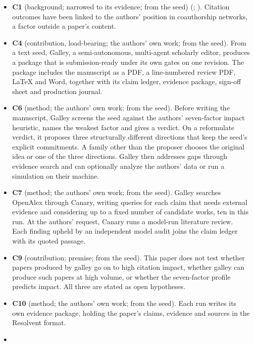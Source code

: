 \documentclass[
]{article}
\providecommand{\tightlist}{%
  \setlength{\itemsep}{0pt}\setlength{\parskip}{0pt}}
\begin{document}
\begin{itemize}
\tightlist
\item
  \textbf{C1} (background; narrowed to its evidence; from the seed)
  (;
  ). Citation outcomes
  have been linked to the authors' position in coauthorship networks, a
  factor outside a paper's content.
\item
  \textbf{C4} (contribution, load-bearing; the authors' own work; from
  the seed). From a text seed, Galley, a semi-autonomous, multi-agent
  scholarly editor, produces a package that is submission-ready under
  its own gates on one revision. The package includes the manuscript as
  a PDF, a line-numbered review PDF, LaTeX and Word, together with its
  claim ledger, evidence package, sign-off sheet and production journal.
\item
  \textbf{C6} (method; the authors' own work; from the seed). Before
  writing the manuscript, Galley screens the seed against the authors'
  seven-factor impact heuristic, names the weakest factor and gives a
  verdict. On a reformulate verdict, it proposes three structurally
  different directions that keep the seed's explicit commitments. A
  family other than the proposer chooses the original idea or one of the
  three directions. Galley then addresses gaps through evidence search
  and can optionally analyze the authors' data or run a simulation on
  their machine.
\item
  \textbf{C7} (method; the authors' own work; from the seed). Galley
  searches OpenAlex through Canary, writing queries for each claim that
  needs external evidence and considering up to a fixed number of
  candidate works, ten in this run. At the authors' request, Canary runs
  a model-run literature review. Each finding upheld by an independent
  model audit joins the claim ledger with its quoted passage.
\item
  \textbf{C9} (contribution; premise; from the seed). This paper does
  not test whether papers produced by galley go on to high citation
  impact, whether galley can produce such papers at high volume, or
  whether the seven-factor profile predicts impact. All three are stated
  as open hypotheses.
\item
  \textbf{C10} (method; the authors' own work; from the seed). Each run
  writes its own evidence package, holding the paper's claims, evidence
  and sources in the Resolvent format.
\item

\end{itemize}
\end{document}
